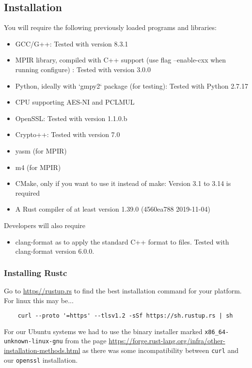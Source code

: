 
\subsection{Installation}\label{subsec:install}
You will require the following previously loaded programs and
libraries:
\begin{itemize}
\item GCC/G++: Tested with version 8.3.1
\item MPIR library, compiled with C++ support (use flag --enable-cxx when running configure) : Tested with version 3.0.0
\item Python, ideally with `gmpy2` package (for testing): Tested with Python 2.7.17
\item CPU supporting AES-NI and PCLMUL
\item OpenSSL: Tested with version 1.1.0.b
\item Crypto++: Tested with version 7.0
\item yasm (for MPIR)
\item m4 (for MPIR)
\item CMake, only if you want to use it instead of make: Version 3.1 to 3.14 is required
\item A Rust compiler of at least version 1.39.0 (4560ea788 2019-11-04)
\end{itemize}
Developers will also require
\begin{itemize}
\item clang-format as to apply the standard C++ format to files. Tested with clang-format version 6.0.0.
\end{itemize}

\subsubsection{Installing Rustc}

Go to \url{https//rustup.rs} to find the best installation command for your platform.
For linux this may be...
\begin{verbatim}
    curl --proto '=https' --tlsv1.2 -sSf https://sh.rustup.rs | sh
\end{verbatim}
For our Ubuntu systems we had to use the binary installer marked
\verb+x86_64-unknown-linux-gnu+ from the page
\url{https://forge.rust-lang.org/infra/other-installation-methods.html}
as there was some incompatibility between \verb+curl+ and our
\verb+openssl+ installation.

